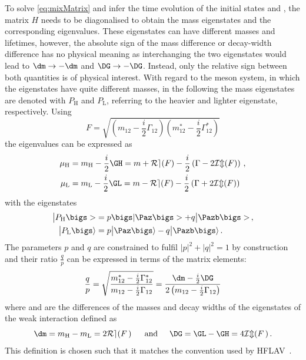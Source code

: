 To solve \cref{eq:mixMatrix} and infer the time evolution of the initial states \Paz and \Pazb, the matrix $H$ needs to be diagonalised to obtain the mass eigenstates and the corresponding eigenvalues.
These eigenstates can have different masses and lifetimes, however, the absolute sign of the mass difference \dm or decay-width difference \DG has no physical meaning as interchanging the two eigenstates would lead to $\dm\to-\dm$ and $\DG\to-\DG$.
Instead, only the relative sign between both quantities is of physical interest.
With regard to the \Bz meson system, in which the eigenstates have quite different masses, in the following the mass eigenstates are denoted with $P_\text{H}$ and $P_\text{L}$, referring to the heavier and lighter eigenstate, respectively.
Using
\begin{equation}
F=\sqrt{\left(m_{12}-\frac{i}{2}\Gamma_{12}\right)\left(m_{12}^\ast-\frac{i}{2}\Gamma_{12}^\ast\right)}
\end{equation}
the eigenvalues can be expressed as
\begin{equation}
\begin{split}
\mu_\text{H} &= m_\text{H}-\frac{i}{2}\GH = m + \mathcal{R{}e}\!\left(F\right)-\frac{i}{2}\left(\Gamma-2\mathcal{I{}m}\!\left(F\right)\right)\,,\\
\mu_\text{L} &= m_\text{L}-\frac{i}{2}\GL = m - \mathcal{R{}e}\!\left(F\right)-\frac{i}{2}\left(\Gamma+2\mathcal{I{}m}\!\left(F\right)\right)\label{eq:Mass_eigenvalues}
\end{split}
\end{equation}
with the eigenstates
\begin{equation}
\begin{split}
\big|P_\text{H}\bigs>&= p\bigs|\Paz\bigs>+q\big|\Pazb\bigs>\,,\\
\big|P_\text{L}\bigs\rangle&= p\big|\Paz\bigs\rangle-q\big|\Pazb\bigs\rangle\,.\label{eq:Mass_eigenstates}
\end{split}
\end{equation}
The parameters $p$ and $q$ are constrained to fulfil $\left|p\right|^2\!+\left|q\right|^2=1$ by construction and their ratio $\frac{q}{p}$ can be expressed in terms of the matrix elements:
\begin{equation}
\frac{q}{p}=\sqrt{ \frac{ m_{12}^\ast-\frac{i}{2}\Gamma_{12}^\ast }{ m_{12}-\frac{i}{2}\Gamma_{12} }}
=\frac{\dm-\frac{i}{2}\DG}{2\left(m_{12}-\frac{i}{2}\Gamma_{12}\right)}\label{eq:qoverp}
\end{equation}
where \dm and \DG are the differences of the masses and decay widths of the eigenstates of the weak interaction defined as
\begin{equation}
\dm=m_\text{H}-m_\text{L}=2\mathcal{R{}e}\!\left(F\,\right)\hspace{0.5cm}\text{and}\hspace{0.5cm}\DG=\GL-\GH=4\mathcal{I{}m}\!\left(F\,\right).\label{eq:define_dmAndDG}
\end{equation}
This definition is chosen such that it matches the convention used by \ac{HFLAV}~\cite{HFLAV2016}.


